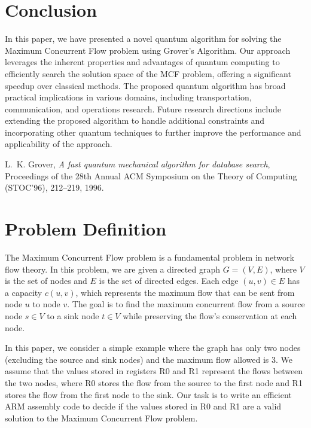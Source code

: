 
\section{Conclusion} \label{conclusion}

In this paper, we have presented a novel quantum algorithm for solving the Maximum Concurrent Flow problem using Grover's Algorithm. Our approach leverages the inherent properties and advantages of quantum computing to efficiently search the solution space of the MCF problem, offering a significant speedup over classical methods. The proposed quantum algorithm has broad practical implications in various domains, including transportation, communication, and operations research. Future research directions include extending the proposed algorithm to handle additional constraints and incorporating other quantum techniques to further improve the performance and applicability of the approach.

% 
% 

\begin{thebibliography}{1}

L.~K. Grover, \emph{A fast quantum mechanical algorithm for database search}, Proceedings of the 28th Annual ACM Symposium on the Theory of Computing (STOC'96), 212--219, 1996.

\end{thebibliography}



\section{Problem Definition}

The Maximum Concurrent Flow problem is a fundamental problem in network flow theory. In this problem, we are given a directed graph $G = (V, E)$, where $V$ is the set of nodes and $E$ is the set of directed edges. Each edge $(u, v) \in E$ has a capacity $c(u, v)$, which represents the maximum flow that can be sent from node $u$ to node $v$. The goal is to find the maximum concurrent flow from a source node $s \in V$ to a sink node $t \in V$ while preserving the flow's conservation at each node.

In this paper, we consider a simple example where the graph has only two nodes (excluding the source and sink nodes) and the maximum flow allowed is 3. We assume that the values stored in registers R0 and R1 represent the flows between the two nodes, where R0 stores the flow from the source to the first node and R1 stores the flow from the first node to the sink. Our task is to write an efficient ARM assembly code to decide if the values stored in R0 and R1 are a valid solution to the Maximum Concurrent Flow problem.

